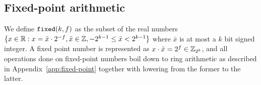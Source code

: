 \subsection{Fixed-point arithmetic}
\label{subsec:fixed-point}


We define $\verb|fixed|(k, f)$ as the subset of the real numbers $\{x \in \mathbb{R} : x = \bar{x} \cdot 2^{-f}, \bar{x} \in \mathbb{Z}, -2^{k-1} \leq \bar{x} < 2^{k-1}\}$ where $\bar{x}$ is at most a $k$ bit signed integer. A fixed point number is represented as $x \cdot \bar{x} = 2^{f} \in \mathbb{Z}_{2^k}$, and all operations done on fixed-point numbers boil down to ring arithmetic as described in Appendix~\ref{app:fixed-point} together with lowering from the former to the latter.
